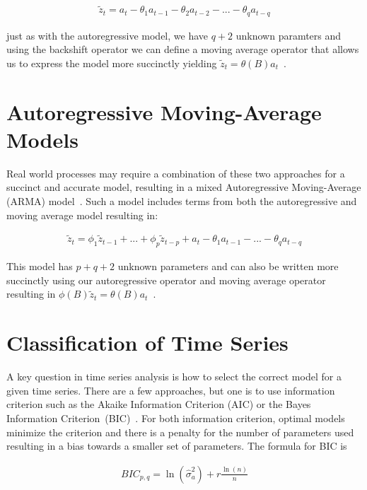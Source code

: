 \documentclass[oneside,12pt,openany]{book}
\begin{document}
	\begin{align}
		\label{eqn:mamodel}
		\tilde{z}_{t}=a_{t}-\theta_{1}a_{t-1}-\theta_{2}a_{t-2}-...-\theta_{q}a_{t-q}
	\end{align}
	
	\noindent just as with the autoregressive model, we have $q+2$ unknown paramters and using the backshift operator we can define a moving average operator that allows us to express the model more succinctly yielding $\tilde{z}_{t}=\theta(B)a_{t}$~\cite{Box}.

	\section{Autoregressive Moving-Average Models}
	
	Real world processes may require a combination of these two approaches for a succinct and accurate model, resulting in a mixed Autoregressive Moving-Average (ARMA) model~\cite{Box}. Such a model includes terms from both the autoregressive and moving average model resulting in:
	
	\begin{align}
		\label{eqn:armamodel}
		\tilde{z}_{t}=\phi_{1} \tilde{z}_{t-1}+...+\phi_{p} \tilde{z}_{t-p}+a_{t}-\theta_{1}a_{t-1}-...-\theta_{q}a_{t-q}
	\end{align}
	
	\noindent This model has $p+q+2$ unknown parameters and can also be written more succinctly using our autoregressive operator and moving average operator resulting in $\phi(B)\tilde{z}_{t}=\theta(B)a_{t}$~\cite{Box}.

	\section{Classification of Time Series}\label{sec:timeseries:classification}

	A key question in time series analysis is how to select the correct model for a given time series. There are a few approaches, but one is to use information criterion such as the Akaike Information Criterion (AIC) or the Bayes Information Criterion~(BIC)~\cite{Box}. For both information criterion, optimal models minimize the criterion and there is a penalty for the number of parameters used resulting in a bias towards a smaller set of parameters. The formula for BIC is

	\begin{align}
		\label{eqn:bic}
		BIC_{p,q}=\ln(\hat{\sigma}_{a}^{2})+r\frac{\ln(n)}{n}
	\end{align}
\end{document}
